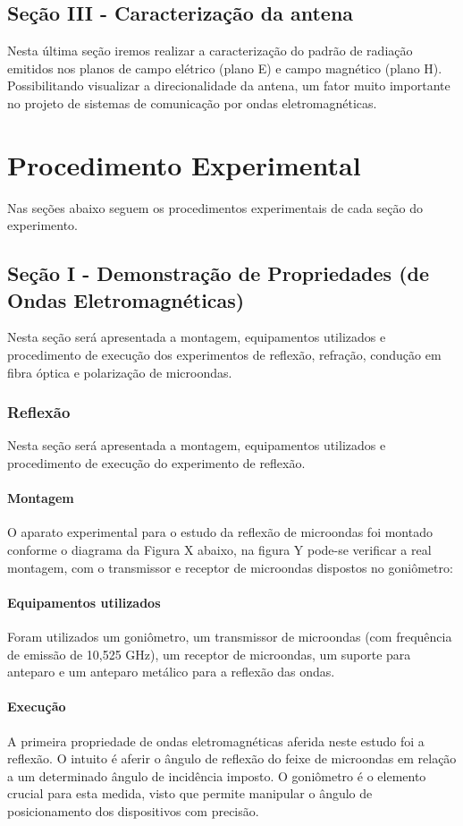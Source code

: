 \documentclass[12pt]{article}
\begin{document}
\subsection{Seção III - Caracterização da antena}
Nesta última seção iremos realizar a caracterização do padrão de
radiação emitidos nos planos de campo elétrico (plano E) e campo
magnético (plano H). Possibilitando visualizar a direcionalidade da
antena, um fator muito importante no projeto de sistemas de
comunicação por ondas eletromagnéticas.

\section{Procedimento Experimental}
Nas seções abaixo seguem os procedimentos experimentais de cada seção
do experimento.

\subsection{Seção I - Demonstração de Propriedades (de Ondas Eletromagnéticas)}
Nesta seção será apresentada a montagem, equipamentos utilizados e
procedimento de execução dos experimentos de reflexão, refração,
condução em fibra óptica e polarização de microondas.

\subsubsection{Reflexão}
Nesta seção será apresentada a montagem, equipamentos utilizados e
procedimento de execução do experimento de reflexão.

\paragraph{Montagem}
O aparato experimental para o estudo da reflexão de microondas foi
montado conforme o diagrama da Figura X abaixo, na figura Y pode-se
verificar a real montagem, com o transmissor e receptor de microondas
dispostos no goniômetro:

\paragraph{Equipamentos utilizados}
Foram utilizados um goniômetro, um transmissor de microondas (com
frequência de emissão de 10,525 GHz), um receptor de microondas, um
suporte para anteparo e um anteparo metálico para a reflexão das ondas.

\paragraph{Execução}
A primeira propriedade de ondas eletromagnéticas aferida neste estudo
foi a reflexão. O intuito é aferir o ângulo de reflexão do feixe de
microondas em relação a um determinado ângulo de incidência imposto.
O goniômetro é o elemento crucial para esta medida, visto que permite
manipular o ângulo de posicionamento dos dispositivos com precisão.
\end{document}
